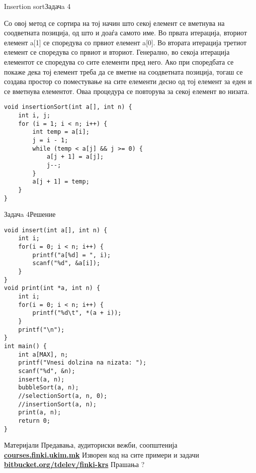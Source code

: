 \begin{frame}[fragile]{Insertion sort}{Задачa 4}
\begin{scriptsize}
Со овој метод се сортира на тој начин што секој елемент се вметнува на
соодветната позиција, од што и доаѓа самото име. Во првата итерација, вториот
елемент a[1] се споредува со првиот елемент a[0]. Во втората итерација третиот
елемент се споредува со првиот и вториот. Генерално, во секоја итерација
елементот се споредува со сите елементи пред него. Ако при споредбата се покаже
дека тој елемент треба да се вметне на соодветната позиција, тогаш се создава
простор со поместување на сите елементи десно од тој елемент за еден и се
вметнува елементот. Оваа процедура се повторува за секој елемент во низата. 
\end{scriptsize}
\begin{lstlisting}
void insertionSort(int a[], int n) {
    int i, j;
    for (i = 1; i < n; i++) {
        int temp = a[i];
        j = i - 1;
        while (temp < a[j] && j >= 0) {
            a[j + 1] = a[j];
            j--;
        }
        a[j + 1] = temp;
    }
}
\end{lstlisting}
\end{frame}

\begin{frame}[fragile]{Задачa 4}{Решение}
\begin{lstlisting}
void insert(int a[], int n) {
    int i;
    for(i = 0; i < n; i++) {
        printf("a[%d] = ", i);
        scanf("%d", &a[i]);
    }
}
void print(int *a, int n) {
    int i;
    for(i = 0; i < n; i++) {
        printf("%d\t", *(a + i));
    }
    printf("\n");
}
int main() {
    int a[MAX], n;
    printf("Vnesi dolzina na nizata: ");
    scanf("%d", &n);
    insert(a, n);
    bubbleSort(a, n);
    //selectionSort(a, n, 0);
    //insertionSort(a, n);
    print(a, n);
    return 0;
}
\end{lstlisting}
\end{frame}


\begin{frame}{Материјали}{}
	Предавања, аудиториски вежби, соопштенија\\
	\href{http://courses.finki.ukim.mk/}{\textbf{courses.finki.ukim.mk}}
	\vfill
	Изворен код на сите примери и задачи\\
	\href{http://bitbucket.org/tdelev/finki-krs/}{\textbf{bitbucket.org/tdelev/finki-krs}}
	\vfill
	{\Huge Прашања ?}
\end{frame}



